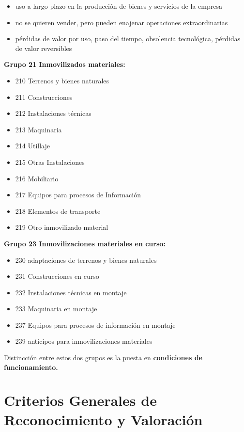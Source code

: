 \documentclass[a4paper,12pt]{article}
\begin{document}
\begin{itemize}
    \item uso a largo plazo en la producción de bienes y servicios de la empresa
    \item no se quieren vender, pero pueden enajenar operaciones extraordinarias
    \item pérdidas de valor por uso, paso del tiempo, obsolencia tecnológica, pérdidas de valor reversibles
\end{itemize}

\textbf{Grupo 21 Inmovilizados materiales:
}\begin{itemize}
    \item 210 Terrenos y bienes naturales
    \item 211 Construcciones
    \item 212 Instalaciones técnicas
    \item 213 Maquinaria
    \item 214 Utillaje
    \item 215 Otras Instalaciones
    \item 216 Mobiliario
    \item 217 Equipos para procesos de Información
    \item 218 Elementos de transporte
    \item 219 Otro inmovilizado material
\end{itemize}

\textbf{Grupo 23 Inmovilizaciones materiales en curso:
}\begin{itemize}
    \item 230 adaptaciones de terrenos y bienes naturales
    \item 231 Construcciones en curso
    \item 232 Instalaciones técnicas en montaje
    \item 233 Maquinaria en montaje
    \item 237 Equipos para procesos de información en montaje
    \item 239 anticipos para inmovilizaciones materiales
\end{itemize}

Distincción entre estos dos grupos es la puesta en \textbf{condiciones de funcionamiento.}

\section{Criterios Generales de Reconocimiento y Valoración}
\end{document}
